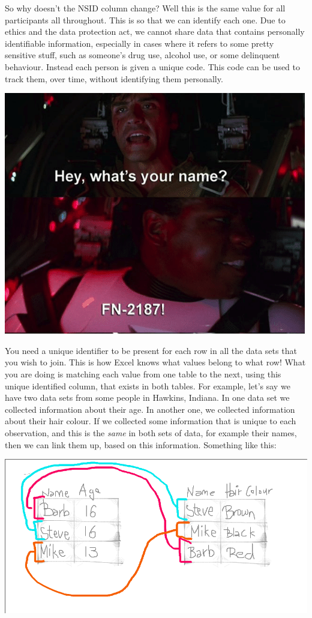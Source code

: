 \documentclass[]{book}
\theoremstyle{definition}
\theoremstyle{definition}
\theoremstyle{definition}
\theoremstyle{remark}
\begin{document}
So why doesn't the NSID column change? Well this is the same value for
all participants all throughout. This is so that we can identify each
one. Due to ethics and the data protection act, we cannot share data
that contains personally identifiable information, especially in cases
where it refers to some pretty sensitive stuff, such as someone's drug
use, alcohol use, or some delinquent behaviour. Instead each person is
given a unique code. This code can be used to track them, over time,
without identifying them personally.

\includegraphics{imgs/fn2187.png}

You need a unique identifier to be present for each row in all the data
sets that you wish to join. This is how Excel knows what values belong
to what row! What you are doing is matching each value from one table to
the next, using this unique identified column, that exists in both
tables. For example, let's say we have two data sets from some people in
Hawkins, Indiana. In one data set we collected information about their
age. In another one, we collected information about their hair colour.
If we collected some information that is unique to each observation, and
this is the \emph{same} in both sets of data, for example their names,
then we can link them up, based on this information. Something like
this:

\includegraphics{imgs/merge_logic_1.png}
\end{document}
